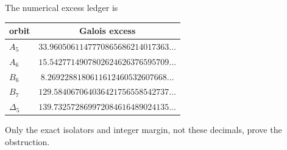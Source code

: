 The numerical excess ledger is
\begin{center}
\begin{tabular}{lc}
\toprule
orbit & Galois excess\\
\midrule
\(A_5\) & \(33.9605061147770865686214017363\ldots\)\\
\(A_6\) & \(15.5427714907802624626376595709\ldots\)\\
\(B_6\) & \(8.2692288180611612460532607668\ldots\)\\
\(B_7\) & \(129.584067064036421756558542737\ldots\)\\
\(\Delta_5\) & \(139.732572869972084616489024135\ldots\)\\
\bottomrule
\end{tabular}
\end{center}
Only the exact isolators and integer margin, not these decimals, prove the
obstruction.
